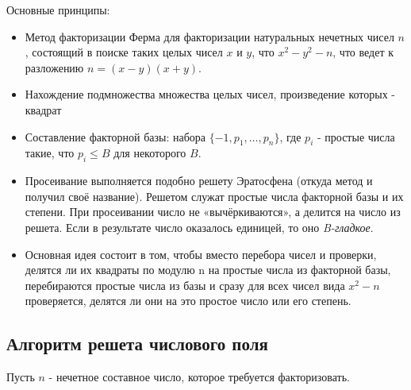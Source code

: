   Основные принципы:
    \begin{itemize}
     \item Метод факторизации Ферма для факторизации натуральных нечетных чисел {$n$}, состоящий в поиске таких целых чисел {$x$} и {$y$},
      что {$x^2-y^2-n$}, что ведет к разложению {$n=(x-y)(x+y)$}.
     \item Нахождение подмножества множества целых чисел, произведение которых - квадрат
     \item Составление факторной базы: набора {$\{-1, p_1, \dots, p_n \}$}, где {$p_i$} - простые числа такие, что {$p_i \le B$} 
      для некоторого {$B$}.
     \item Просеивание выполняется подобно решету Эратосфена (откуда метод и получил своё название). Решетом служат простые числа 
      факторной базы и их степени. При просеивании число не «вычёркиваются», а делится на число из решета. Если в результате число 
      оказалось единицей, то оно \textit{B-гладкое}.
     \item Основная идея состоит в том, чтобы вместо перебора чисел и проверки, делятся ли их квадраты по модулю n на простые числа из 
      факторной базы, перебираются простые числа из базы и сразу для всех чисел вида {$x^2-n$} проверяется, делятся ли они на это простое 
      число или его степень.
    \end{itemize}      
    
  \subsection{Алгоритм решета числового поля}
  Пусть {$n$} - нечетное составное число, которое требуется факторизовать.
  
